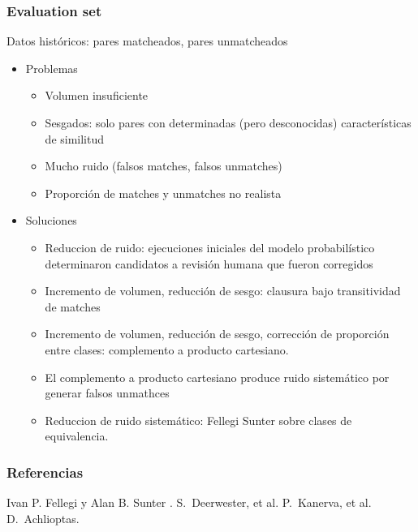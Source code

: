 \documentclass{beamer}
\begin{document}
\begin{frame}
	\frametitle{Evaluation set}
	Datos históricos: pares matcheados, pares unmatcheados
	
	  \begin{itemize}
\item Problemas
  \begin{itemize}
    \item Volumen insuficiente 
	  \item Sesgados: solo pares con determinadas (pero desconocidas) características de similitud
	  \item Mucho ruido (falsos matches, falsos unmatches)
	  \item Proporción de matches y unmatches no realista
	\end{itemize}  
\item Soluciones	


  \begin{itemize}
	  \item Reduccion de ruido: ejecuciones iniciales del modelo probabilístico determinaron candidatos a revisión humana que fueron corregidos
	  \item Incremento de volumen, reducción de sesgo: clausura bajo transitividad de matches
	  \item Incremento de volumen, reducción de sesgo, corrección de proporción entre clases: complemento a producto cartesiano.
	  \item El complemento a producto cartesiano produce ruido sistemático por generar falsos unmathces
	  \item Reduccion de ruido sistemático: Fellegi Sunter sobre clases de equivalencia.
	 \end{itemize}

\end{itemize}

	
\end{frame}


\begin{frame}%
  \frametitle{Referencias}    
  \begin{thebibliography}{10}
  \beamertemplatearticlebibitems
    Ivan P. Fellegi y Alan B. Sunter
    .
  \beamertemplatearticlebibitems
    S.~Deerwester, et al.
  \beamertemplatearticlebibitems
    P.~Kanerva, et al.
  \beamertemplatearticlebibitems
    D.~Achlioptas.
  \end{thebibliography}
\end{frame}
\end{document}

